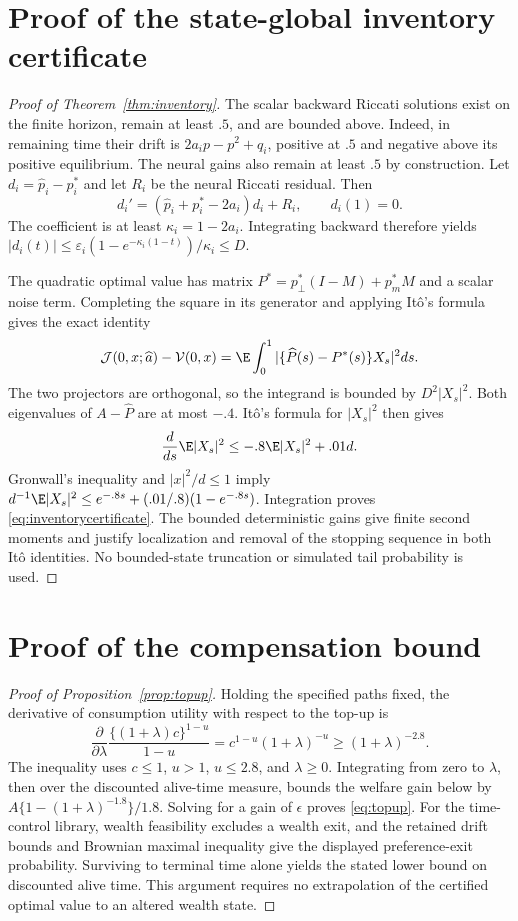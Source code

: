 \section{Proof of the state-global inventory certificate}\label{app:inventory}
\begin{proof}[Proof of Theorem~\ref{thm:inventory}]
The scalar backward Riccati solutions exist on the finite horizon, remain at least $.5$, and are bounded above. Indeed, in remaining time their drift is $2a_i p-p^2+q_i$, positive at $.5$ and negative above its positive equilibrium. The neural gains also remain at least $.5$ by construction. Let $d_i=\widehat p_i-p_i^*$ and let $R_i$ be the neural Riccati residual. Then
\[
 d_i'=(\widehat p_i+p_i^*-2a_i)d_i+R_i,\qquad d_i(1)=0.
\]
The coefficient is at least $\kappa_i=1-2a_i$. Integrating backward therefore yields $|d_i(t)|\leq\varepsilon_i(1-e^{-\kappa_i(1-t)})/\kappa_i\leq D$.

The quadratic optimal value has matrix $P^*=p_\perp^*(I-M)+p_m^*M$ and a scalar noise term. Completing the square in its generator and applying It\^o's formula gives the exact identity
\[
 \mathcal J(0,x;\widehat a)-\mathcal V(0,x)
 =\E\int_0^1|\{\widehat P(s)-P^*(s)\}X_s|^2ds.
\]
The two projectors are orthogonal, so the integrand is bounded by $D^2|X_s|^2$. Both eigenvalues of $A-\widehat P$ are at most $-.4$. It\^o's formula for $|X_s|^2$ then gives
\[
 \frac{d}{ds}\E|X_s|^2\leq-.8\E|X_s|^2+.01d.
\]
Gronwall's inequality and $|x|^2/d\leq1$ imply $d^{-1}\E|X_s|^2\leq e^{-.8s}+(.01/.8)(1-e^{-.8s})$. Integration proves \eqref{eq:inventorycertificate}. The bounded deterministic gains give finite second moments and justify localization and removal of the stopping sequence in both It\^o identities. No bounded-state truncation or simulated tail probability is used.
\end{proof}

\section{Proof of the compensation bound}
\begin{proof}[Proof of Proposition~\ref{prop:topup}]
Holding the specified paths fixed, the derivative of consumption utility with respect to the top-up is
\[
 \frac{\partial}{\partial\lambda}\frac{\{(1+\lambda)c\}^{1-u}}{1-u}
 =c^{1-u}(1+\lambda)^{-u}\geq(1+\lambda)^{-2.8}.
\]
The inequality uses $c\leq1$, $u>1$, $u\leq2.8$, and $\lambda\geq0$. Integrating from zero to $\lambda$, then over the discounted alive-time measure, bounds the welfare gain below by $A\{1-(1+\lambda)^{-1.8}\}/1.8$. Solving for a gain of $\epsilon$ proves \eqref{eq:topup}. For the time-control library, wealth feasibility excludes a wealth exit, and the retained drift bounds and Brownian maximal inequality give the displayed preference-exit probability. Surviving to terminal time alone yields the stated lower bound on discounted alive time. This argument requires no extrapolation of the certified optimal value to an altered wealth state.
\end{proof}
